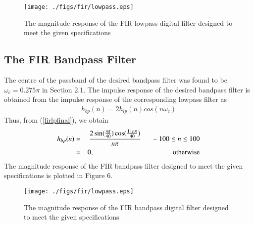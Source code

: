 \documentclass[journal,12pt,twocolumn]{IEEEtran}
\begin{document}
\begin{figure}
\label{fig5}
\texttt{[image: ./figs/fir/lowpass.eps]}
\caption{The magnitude response of the FIR lowpass digital filter designed to meet the given specifications} 
\end{figure}

\subsection{The FIR Bandpass Filter}
The centre of the passband of the desired bandpass filter was found to be $\omega_c = 0.275\pi$ in Section
2.1.  The impulse response of the desired bandpass filter is obtained from the impulse response of the
corresponding lowpass filter as
\begin{eqnarray}
h_{bp}(n) = 2h_{lp}(n)cos(n\omega_c)
\end{eqnarray}
Thus, from (\ref{firlpfinal}), we obtain
\begin{eqnarray}
\label{firbpfinal}
h_{bp}(n) &=& \frac{2\sin(\frac{n\pi}{40}) \cos(\frac{11n\pi}{40})}{n\pi} \indent -100 \leq n \leq 100 \nonumber \\
&=& 0, \hspace{4cm} \mbox{otherwise}
\end{eqnarray}
%
The magnitude response of the FIR bandpass filter designed to meet the given specifications is plotted in Figure 6.
\begin{figure}
\label{fig6}
\texttt{[image: ./figs/fir/lowpass.eps]}
\caption{The magnitude response of the FIR bandpass digital filter designed to meet the given specifications} 
\end{figure}
\end{document}
